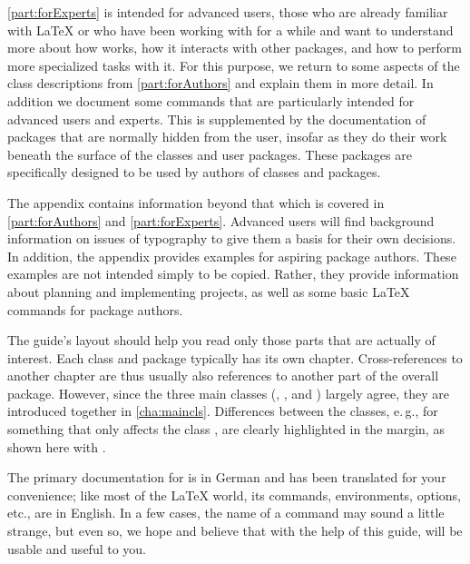 \autoref{part:forExperts} is intended for advanced {\KOMAScript} users, those
who are already familiar with \LaTeX{} or who have been working with
{\KOMAScript} for a while and want to understand more about how {\KOMAScript}
works, how it interacts with other packages, and how to perform more
specialized tasks with it. For this purpose, we return to some aspects of the
class descriptions from \autoref{part:forAuthors} and explain them in more
detail. In addition we document some commands that are particularly intended
for advanced users and experts. This is supplemented by the documentation of
packages that are normally hidden from the user, insofar as they do their work
beneath the surface of the classes and user packages. These packages are
specifically designed to be used by authors of classes and packages.

The appendix
contains information beyond that which is covered in \autoref{part:forAuthors}
and \autoref{part:forExperts}. Advanced users will find background information
on issues of typography to give them a basis for their own decisions. In
addition, the appendix provides examples for aspiring package authors. These
examples are not intended simply to be copied. Rather, they provide
information about planning and implementing projects, as well as some basic
\LaTeX{} commands for package authors.

The guide's layout should help you read only those parts that are actually of
interest. Each class and package typically has its own chapter.
Cross-references to another chapter are thus usually also references to
another part of the overall package. However, since the three main classes
(, , and ) largely agree, they
are introduced together in \autoref{cha:maincls}. Differences between the
classes, e.\,g., for something that only affects the class
, are clearly highlighted in the
margin, as shown here with .

\begin{Explain} 
  The primary documentation for {\KOMAScript} is in German and has been
  translated for your convenience; like most of the {\LaTeX} world, its
  commands, environments, options, etc., are in English. In a few cases, the
  name of a command may sound a little strange, but even so, we hope and
  believe that with the help of this guide, {\KOMAScript} will be usable
  and useful to you.
\end{Explain}

